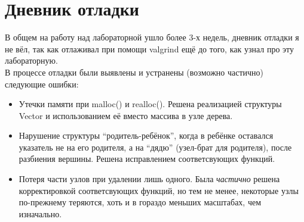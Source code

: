 \section{Дневник отладки}
В общем на работу над лабораторной  ушло более 3-х недель, дневник отладки я не вёл, так как отлаживал при помощи valgrind ещё до того, как узнал про эту лабораторную. \\
В процессе отладки были выявлены и устранены (возможно частично) следующие ошибки: 
\begin{itemize}
	\item Утечки памяти при malloc() и realloc(). Решена реализацией структуры {\ttfamily Vector} и использованием её вместо массива в узле дерева.
	\item Нарушение структуры \enquote{родитель-ребёнок}, когда в ребёнке оставался указатель не на его родителя, а на \enquote{дядю} (узел-брат для родителя), после разбиения вершины. Решена исправлением соответсвующих функций.
	\item Потеря части узлов при удалении лишь одного. Была {\itshape частично} решена корректировкой соответсвующих функций, но тем не менее, некоторые узлы по-прежнему теряются, хоть и в гораздо меньших масштабах, чем изначально.
\end{itemize}

\pagebreak



